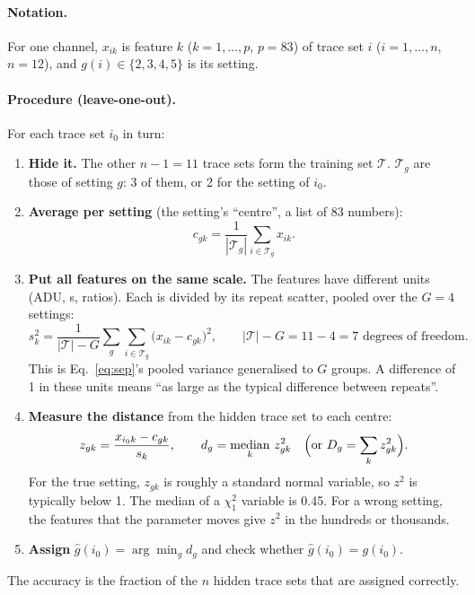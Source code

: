 \documentclass[10pt]{article}
\begin{document}
\paragraph{Notation.} For one channel, $x_{ik}$ is feature $k$ ($k = 1,\dots,p$, $p = 83$) of trace set $i$
($i = 1,\dots,n$, $n = 12$), and $g(i) \in \{2,3,4,5\}$ is its setting.

\paragraph{Procedure (leave-one-out).} For each trace set $i_0$ in turn:
\begin{enumerate}
\item \textbf{Hide it.} The other $n-1 = 11$ trace sets form the training set $\mathcal T$. $\mathcal T_g$ are those of
  setting $g$: 3 of them, or 2 for the setting of $i_0$.
\item \textbf{Average per setting} (the setting's ``centre'', a list of 83 numbers):
  \begin{equation}
  c_{gk} = \frac{1}{|\mathcal T_g|}\sum_{i\in\mathcal T_g} x_{ik}.
  \end{equation}
\item \textbf{Put all features on the same scale.} The features have different units (ADU, \textmu s, ratios). Each is
  divided by its repeat scatter, pooled over the $G = 4$ settings:
  \begin{equation}
  s_k^2 = \frac{1}{|\mathcal T| - G}\sum_{g}\sum_{i\in\mathcal T_g} \bigl(x_{ik} - c_{gk}\bigr)^2 ,
  \qquad |\mathcal T| - G = 11 - 4 = 7 \text{ degrees of freedom}.
  \label{eq:pooled}
  \end{equation}
  This is Eq.~\ref{eq:sep}'s pooled variance generalised to $G$ groups. A difference of 1 in these units means ``as large as
  the typical difference between repeats''.
\item \textbf{Measure the distance} from the hidden trace set to each centre:
  \begin{equation}
  z_{gk} = \frac{x_{i_0 k} - c_{gk}}{s_k}, \qquad d_g = \operatorname*{median}_{k}\, z_{gk}^2
  \quad\Bigl(\text{or } D_g = \sum_k z_{gk}^2\Bigr).
  \end{equation}
  For the true setting, $z_{gk}$ is roughly a standard normal variable, so $z^2$ is typically below 1. The median of a
  $\chi^2_1$ variable is 0.45. For a wrong setting, the features that the parameter moves give $z^2$ in the hundreds or
  thousands.
\item \textbf{Assign} $\hat g(i_0) = \arg\min_g d_g$ and check whether $\hat g(i_0) = g(i_0)$.
\end{enumerate}
The accuracy is the fraction of the $n$ hidden trace sets that are assigned correctly.
\end{document}
